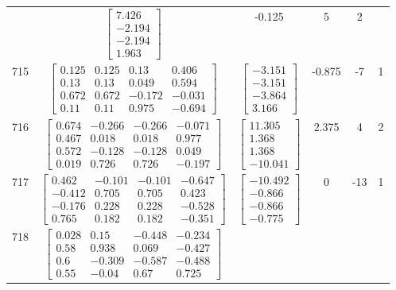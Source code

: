 \documentclass[a4paper,12pt]{article}
\begin{document}
\begin{tabular}{c c c c c c}
&
$\begin{bmatrix} 7.426 \\ -2.194 \\ -2.194 \\ 1.963 \end{bmatrix}$
&
-0.125
&
5
&
2
\\
715
&
$\begin{bmatrix} 0.125 & 0.125 & 0.13 & 0.406 \\ 0.13 & 0.13 & 0.049 & 0.594 \\ 0.672 & 0.672 & -0.172 & -0.031 \\ 0.11 & 0.11 & 0.975 & -0.694 \end{bmatrix}$
&
$\begin{bmatrix} -3.151 \\ -3.151 \\ -3.864 \\ 3.166 \end{bmatrix}$
&
-0.875
&
-7
&
1
\\
716
&
$\begin{bmatrix} 0.674 & -0.266 & -0.266 & -0.071 \\ 0.467 & 0.018 & 0.018 & 0.977 \\ 0.572 & -0.128 & -0.128 & 0.049 \\ 0.019 & 0.726 & 0.726 & -0.197 \end{bmatrix}$
&
$\begin{bmatrix} 11.305 \\ 1.368 \\ 1.368 \\ -10.041 \end{bmatrix}$
&
2.375
&
4
&
2
\\
717
&
$\begin{bmatrix} 0.462 & -0.101 & -0.101 & -0.647 \\ -0.412 & 0.705 & 0.705 & 0.423 \\ -0.176 & 0.228 & 0.228 & -0.528 \\ 0.765 & 0.182 & 0.182 & -0.351 \end{bmatrix}$
&
$\begin{bmatrix} -10.492 \\ -0.866 \\ -0.866 \\ -0.775 \end{bmatrix}$
&
0
&
-13
&
1
\\
718
&
$\begin{bmatrix} 0.028 & 0.15 & -0.448 & -0.234 \\ 0.58 & 0.938 & 0.069 & -0.427 \\ 0.6 & -0.309 & -0.587 & -0.488 \\ 0.55 & -0.04 & 0.67 & 0.725 \end{bmatrix}$

\end{tabular}
\end{document}
